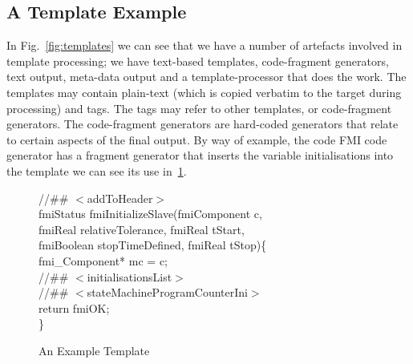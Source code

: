 \documentclass{llncs}%
\begin{document}
\subsection{A Template Example}
In Fig.~\ref{fig:templates} we can see that we have a number of artefacts involved in template processing; we have text-based templates, code-fragment generators, text output, meta-data output and a template-processor that does the work. The templates may contain plain-text (which is copied verbatim to the target during processing) and tags. The tags may refer to other templates, or code-fragment generators. The code-fragment generators are hard-coded generators that relate to certain aspects of the final output. By way of example, the code FMI code generator has a fragment generator that inserts the variable initialisations into the template we can see its use in~\ref{fig:templateExample}. 
%
\begin{figure}
\begin{center}
\begin{minipage}{0.8\textwidth}
//\#\# $<$addToHeader$>$\\
fmiStatus fmiInitializeSlave(fmiComponent c,\\
\hspace*{0.2cm}fmiReal relativeTolerance, fmiReal tStart,\\
\hspace*{0.2cm}fmiBoolean stopTimeDefined, fmiReal tStop)\{\\
\hspace*{0.4cm}fmi\_Component* mc = c;\\
\hspace*{0.4cm}//\#\# $<$initialisationsList$>$\\
\hspace*{0.4cm}//\#\# $<$stateMachineProgramCounterIni$>$\\
\hspace*{0.4cm}return fmiOK;\\
\}
\end{minipage}
\end{center}
\caption{An Example Template}
\label{fig:templateExample}
\end{figure}
%
%
\end{document}
